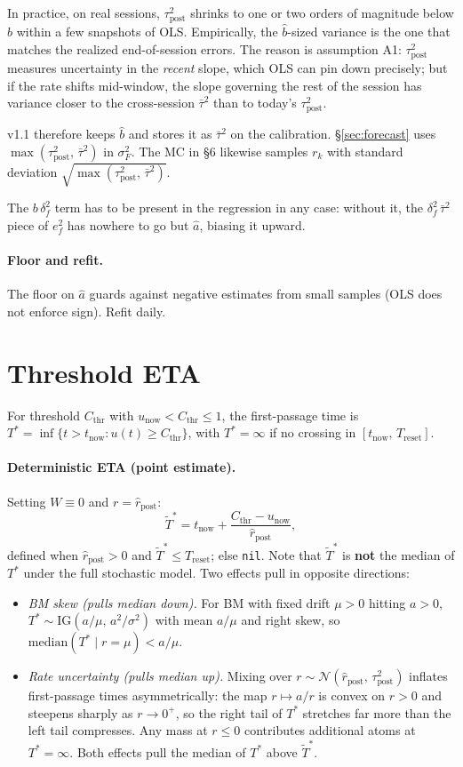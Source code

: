 \documentclass[11pt]{article}
\newcommand{\rpost}{\hat r_{\text{post}}}
\newcommand{\taupostsq}{\tau_{\text{post}}^2}
\newcommand{\unow}{u_{\text{now}}}
\newcommand{\tnow}{t_{\text{now}}}
\newcommand{\Treset}{T_{\text{reset}}}
\newcommand{\Cthr}{C_{\text{thr}}}
\newcommand{\Tstar}{T^\ast}
\begin{document}
In practice, on real sessions, $\taupostsq$ shrinks to one or two orders of
magnitude below $\hat b$ within a few snapshots of OLS. Empirically, the
$\hat b$-sized variance is the one that matches the realized end-of-session
errors. The reason is assumption A1: $\taupostsq$ measures uncertainty in
the \emph{recent} slope, which OLS can pin down precisely; but if the rate
shifts mid-window, the slope governing the rest of the session has variance
closer to the cross-session $\bar\tau^2$ than to today's $\taupostsq$.

v1.1 therefore keeps $\hat b$ and stores it as $\bar\tau^2$ on the
calibration. \S\ref{sec:forecast} uses $\max(\taupostsq,\, \bar\tau^2)$ in
$\sigma_F^2$. The MC in \S6 likewise samples $r_k$ with standard deviation
$\sqrt{\max(\taupostsq,\, \bar\tau^2)}$.

The $b\,\delta_f^2$ term has to be present in the regression in any case:
without it, the $\delta_f^2\,\bar\tau^2$ piece of $e_f^2$ has nowhere to go
but $\hat a$, biasing it upward.

\paragraph{Floor and refit.} The floor on $\hat a$ guards against negative
estimates from small samples (OLS does not enforce sign). Refit daily.

\section{Threshold ETA}

For threshold $\Cthr$ with $\unow < \Cthr \leq 1$, the first-passage time is
$\Tstar = \inf\{t > \tnow : u(t) \geq \Cthr\}$, with $\Tstar = \infty$ if no
crossing in $[\tnow,\, \Treset]$.

\paragraph{Deterministic ETA (point estimate).} Setting $W \equiv 0$ and $r
= \rpost$:
\[
  \tilde\Tstar = \tnow + \frac{\Cthr - \unow}{\rpost},
\]
defined when $\rpost > 0$ and $\tilde\Tstar \leq \Treset$; else
\texttt{nil}. Note that $\tilde\Tstar$ is \textbf{not} the median of
$\Tstar$ under the full stochastic model. Two effects pull in opposite
directions:

\begin{itemize}
  \item \emph{BM skew (pulls median down).} For BM with fixed drift $\mu > 0$
    hitting $a > 0$, $\Tstar \sim \mathrm{IG}(a/\mu,\, a^2/\sigma^2)$ with
    mean $a/\mu$ and right skew, so $\mathrm{median}(\Tstar \mid r{=}\mu) <
    a/\mu$.
  \item \emph{Rate uncertainty (pulls median up).} Mixing over $r \sim
    \mathcal{N}(\rpost,\, \taupostsq)$ inflates first-passage times
    asymmetrically: the map $r \mapsto a/r$ is convex on $r > 0$ and
    steepens sharply as $r \to 0^+$, so the right tail of $\Tstar$
    stretches far more than the left tail compresses. Any mass at $r \leq
    0$ contributes additional atoms at $\Tstar = \infty$. Both effects pull
    the median of $\Tstar$ above $\tilde\Tstar$.
\end{itemize}
\end{document}
